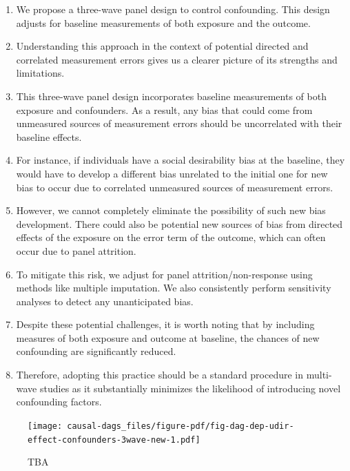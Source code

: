 \documentclass[
  singlecolumn]{report}
\begin{document}
\begin{enumerate}
\def\labelenumi{\arabic{enumi}.}
\item
  We propose a three-wave panel design to control confounding. This
  design adjusts for baseline measurements of both exposure and the
  outcome.
\item
  Understanding this approach in the context of potential directed and
  correlated measurement errors gives us a clearer picture of its
  strengths and limitations.
\item
  This three-wave panel design incorporates baseline measurements of
  both exposure and confounders. As a result, any bias that could come
  from unmeasured sources of measurement errors should be uncorrelated
  with their baseline effects.
\item
  For instance, if individuals have a social desirability bias at the
  baseline, they would have to develop a different bias unrelated to the
  initial one for new bias to occur due to correlated unmeasured sources
  of measurement errors.
\item
  However, we cannot completely eliminate the possibility of such new
  bias development. There could also be potential new sources of bias
  from directed effects of the exposure on the error term of the
  outcome, which can often occur due to panel attrition.
\item
  To mitigate this risk, we adjust for panel attrition/non-response
  using methods like multiple imputation. We also consistently perform
  sensitivity analyses to detect any unanticipated bias.
\item
  Despite these potential challenges, it is worth noting that by
  including measures of both exposure and outcome at baseline, the
  chances of new confounding are significantly reduced.
\item
  Therefore, adopting this practice should be a standard procedure in
  multi-wave studies as it substantially minimizes the likelihood of
  introducing novel confounding factors.
\end{enumerate}

\begin{figure}

{\centering \texttt{[image: causal-dags\_files/figure-pdf/fig-dag-dep-udir-effect-confounders-3wave-new-1.pdf]}

}

\caption{\label{fig-dag-dep-udir-effect-confounders-3wave-new}TBA}

\end{figure}
\end{document}
